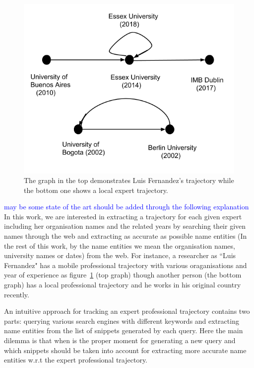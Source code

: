 \documentclass[11pt,a4paper]{article}
\newcommand{\PA}[1]{{\textcolor{blue}{#1}}}
\begin{document}
\begin{figure}[!t]
\centering
\includegraphics[scale=0.3]{./images/trajectory.png}
\caption{The graph in the top demonstrates Luis Fernandez's trajectory while the bottom one shows a local expert trajectory. }
\label{fig:traj}
\end{figure}

\PA{may be some state of the art should be added through the following explanation}\\
In this work, we are interested in extracting a trajectory for each given expert including her organisation names and the related years by searching their given names through the web and extracting as accurate as possible name entities (In the rest of this work, by the name entities we mean the organisation names, university names or dates) from the web.  For instance, a researcher as ``Luis Fernandez" has a mobile professional trajectory with various oraganisations and year of experience as figure~\ref{fig:traj} (top graph) though another person (the bottom graph) has a local professional trajectory and he works in his original country recently.  

An intuitive approach for tracking an expert professional trajectory contains two parts: querying various search engines with different keywords and extracting name entities from the list of snippets generated by each query. Here the main dilemma is that when is the proper moment for generating a new query and which snippets should be taken into account for extracting more accurate name entities w.r.t the expert professional trajectory. %
\end{document}
